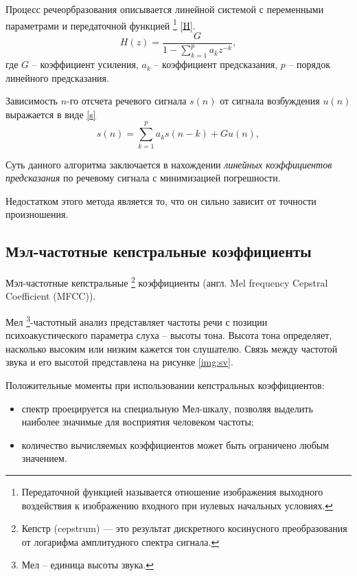 Процесс речеорбразования описывается линейной системой с переменными параметрами и передаточной функцией \footnote{Передаточной функцией называется отношение изображения выходного воздействия к изображению входного при нулевых начальных условиях.} \eqref{H}.
\begin{equation}
\label{H}
H(z) = \frac{G}{1 - \sum_{k = 1}^{p} a_k z^{-k}},
\end{equation}
где $G$ -- коэффициент усиления, $a_k$ -- коэффициент предсказания, $p$ -- порядок линейного предсказания.

Зависимость $n$-го отсчета речевого сигнала $s(n)$ от сигнала возбуждения $u(n)$ выражается в виде \eqref{s}
\begin{equation}
\label{s}
s(n) = \sum_{k = 1}^{p} a_k s(n - k) + G u(n),
\end{equation}


Суть данного алгоритма заключается в нахождении \textit{линейных коэффициентов предсказания} по речевому сигнала с минимизацией погрешности.

Недостатком этого метода является то, что он сильно зависит от точности произношения.

\subsection{Мэл-частотные кепстральные коэффициенты}
Мэл-частотные кепстральные \footnote{Кепстр (cepstrum) — это результат дискретного косинусного преобразования от логарифма амплитудного спектра сигнала.} коэффициенты (англ. Mel frequency \newline Cepstral Coefficient (MFCC)).

Мел \footnote{Мел -- единица высоты звука.}-частотный анализ представляет частоты речи с позиции психоакустического параметра слуха – высоты тона. Высота тона определяет, насколько высоким или низким кажется тон слушателю. Связь между частотой звука и его высотой представлена на рисунке \ref{img:sv}. \cite{methodisb} \cite{methodisb2}

Положительные моменты при использовании кепстральных коэффициентов:
\begin{itemize}
	\item спектр проецируется на специальную Мел-шкалу, позволяя выделить наиболее значимые для восприятия человеком частоты;
	\item количество вычисляемых коэффициентов может быть ограничено любым значением.
\end{itemize}
	
